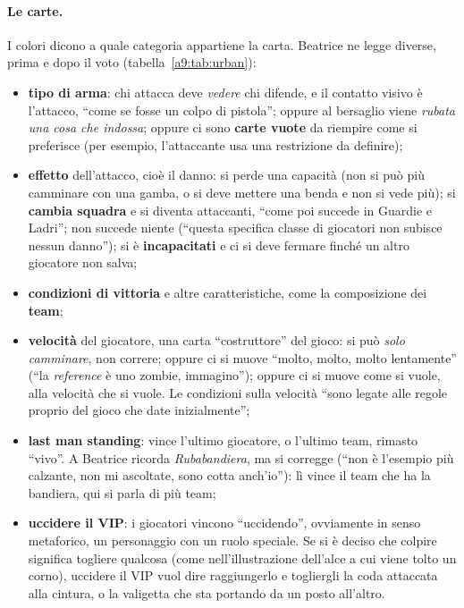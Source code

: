 \paragraph{Le carte.} I colori dicono a quale categoria appartiene la carta. Beatrice
ne legge diverse, prima e dopo il voto (tabella~\ref{a9:tab:urban}):
\begin{itemize}
  \item \textbf{tipo di arma}: chi attacca deve \emph{vedere} chi difende, e il
        contatto visivo è l'attacco, ``come se fosse un colpo di pistola''; oppure al
        bersaglio viene \emph{rubata una cosa che indossa}; oppure ci sono
        \textbf{carte vuote} da riempire come si preferisce (per esempio, l'attaccante
        usa una restrizione da definire);
  \item \textbf{effetto} dell'attacco, cioè il danno: si perde una capacità (non si
        può più camminare con una gamba, o si deve mettere una benda e non si vede
        più); si \textbf{cambia squadra} e si diventa attaccanti, ``come poi succede in
        Guardie e Ladri''; non succede niente (``questa specifica classe di giocatori
        non subisce nessun danno''); si è \textbf{incapacitati} e ci si deve fermare
        finché un altro giocatore non salva;
  \item \textbf{condizioni di vittoria} e altre caratteristiche, come la composizione
        dei \textbf{team};
  \item \textbf{velocità} del giocatore, una carta ``costruttore'' del gioco: si può
        \emph{solo camminare}, non correre; oppure ci si muove ``molto, molto, molto
        lentamente'' (``la \emph{reference} è uno zombie, immagino''); oppure ci si
        muove come si vuole, alla velocità che si vuole. Le condizioni sulla velocità
        ``sono legate alle regole proprio del gioco che date inizialmente'';
  \item \textbf{last man standing}: vince l'ultimo giocatore, o l'ultimo team,
        rimasto ``vivo''. A Beatrice ricorda \emph{Rubabandiera}, ma si corregge
        (``non è l'esempio più calzante, non mi ascoltate, sono cotta anch'io''): lì
        vince il team che ha la bandiera, qui si parla di più team;
  \item \textbf{uccidere il VIP}: i giocatori vincono ``uccidendo'', ovviamente in
        senso metaforico, un personaggio con un ruolo speciale. Se si è deciso che
        colpire significa togliere qualcosa (come nell'illustrazione dell'alce a cui
        viene tolto un corno), uccidere il VIP vuol dire raggiungerlo e togliergli la
        coda attaccata alla cintura, o la valigetta che sta portando da un posto
        all'altro.
\end{itemize}

